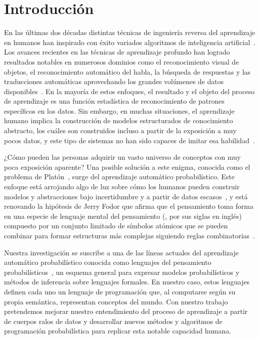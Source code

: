 
\chapter{Introducción}
\label{intro}

En las últimas dos décadas distintas técnicas de ingeniería reversa del aprendizaje en humanos han inspirado con éxito variados algoritmos de inteligencia artificial~\cite{russell2002artificial}. Los avances recientes en las técnicas de aprendizaje profundo han logrado resultados notables en numerosos dominios como el reconocimiento visual de objetos, el reconocimiento automático del habla, la búsqueda de respuestas y las traducciones automáticas aprovechando los grandes volúmenes de datos disponibles~\cite{lecun2015deep}. En la mayoría de estos enfoques, el resultado y el objeto del proceso de aprendizaje es una función estadística de reconocimiento de patrones específicos en los datos. Sin embargo, en muchas situaciones, el aprendizaje humano implica la construcción de modelos estructurados de conocimiento abstracto, los cuáles son construidos incluso a partir de la exposición a muy pocos datos, y este tipo de sistemas no han sido capaces de imitar esa habilidad~\cite{lake2017building}.

¿Cómo pueden las personas adquirir un vasto universo de conceptos con muy poca exposición aparente? Una posible solución a este enigma, conocida como el problema de Platón~\cite{chomsky1986knowledge, chomsky2006cognitive}, surge del aprendizaje automático probabilístico. Este enfoque está arrojando algo de luz sobre cómo los humanos pueden construir modelos y abstracciones bajo incertidumbre y a partir de datos escasos~\cite{tenenbaum2011grow,ghahramani2015probabilistic}, y está renovando la hipótesis de Jerry Fodor que afirma que el pensamiento toma forma en una especie de lenguaje mental del pensamiento (\lot, por sus siglas en inglés) compuesto por un conjunto limitado de símbolos atómicos que se pueden combinar para formar estructuras más complejas siguiendo reglas combinatorias~\cite{fodor1975language}.

Nuestra investigación se suscribe a una de las líneas actuales del aprendizaje automático probabilístico conocida como lenguajes del pensamiento probabilísticos~\cite{goodman2014concepts}, un esquema general para expresar modelos probabilísticos y métodos de inferencia sobre lenguajes formales. En nuestro caso, estos lenguajes definen cada uno un lenguaje de programación que, al computarse según su propia semántica, representan conceptos del mundo. Con nuestro trabajo pretendemos mejorar nuestro entendimiento del proceso de aprendizaje a partir de cuerpos ralos de datos y desarrollar nuevos métodos y algoritmos de programación probabilística para replicar esta notable capacidad humana. 


